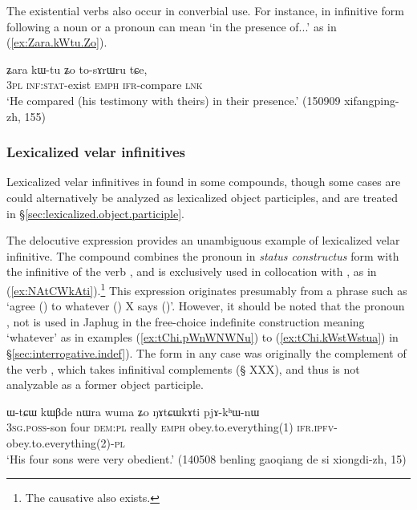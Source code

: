 The existential verbs also occur in converbial use. For instance,  in infinitive form  following a noun or a pronoun can mean `in the presence of...' as in (\ref{ex:Zara.kWtu.Zo}).

\begin{exe}
\ex \label{ex:Zara.kWtu.Zo}
\gll ʑara kɯ-tu ʑo to-sɤrɯru tɕe, \\
\textsc{3pl} \textsc{inf:stat}-exist \textsc{emph} \textsc{ifr}-compare \textsc{lnk} \\
\glt `He compared (his testimony with theirs) in their presence.' (150909 xifangping-zh, 155)
\end{exe}


 
\subsubsection{Lexicalized velar infinitives}    \label{sec:lexicalized.velar.inf}
Lexicalized velar infinitives in  found in some compounds, though some cases are could alternatively be analyzed as lexicalized object participles, and are treated in §\ref{sec:lexicalized.object.participle}.

The delocutive expression  provides an unambiguous example of lexicalized velar infinitive. The compound  combines the pronoun  in \textit{status constructus} form  with the  infinitive  of the verb , and is exclusively used in collocation with , as in (\ref{ex:NAtCWkAti}).\footnote{The causative  also exists.} 
This expression originates presumably from a phrase such as `agree () to whatever () X says ()'. However, it should be noted that the pronoun , not  is used in Japhug in the free-choice indefinite construction meaning `whatever' as in examples (\ref{ex:tChi.pWnWNWNu}) to (\ref{ex:tChi.kWstWstua}) in §\ref{sec:interrogative.indef}). The form  in any case was originally the complement of the verb , which takes infinitival complements (§ XXX), and thus is not analyzable as a former object participle.

 \begin{exe}
\ex \label{ex:NAtCWkAti}
\gll  ɯ-tɕɯ kɯβde nɯra wuma ʑo ŋɤtɕɯkɤti pjɤ-kʰɯ-nɯ  \\
\textsc{3sg}.\textsc{poss}-son four \textsc{dem}:\textsc{pl} really \textsc{emph} obey.to.everything(1) \textsc{ifr.ipfv}-obey.to.everything(2)-\textsc{pl} \\
\glt `His four sons were very obedient.' (140508 benling gaoqiang de si xiongdi-zh, 15)
\end{exe} 

